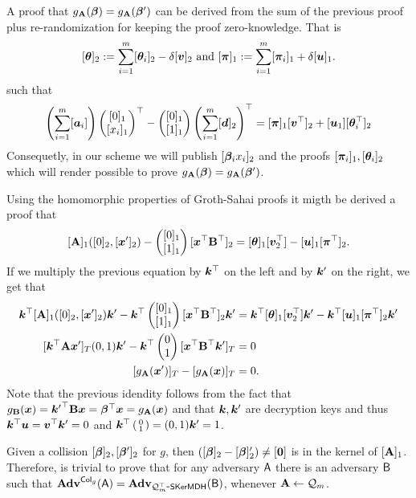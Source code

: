 A proof that $g_{\mathbf{{A}}}({\boldsymbol{\beta}}) = g_{\mathbf{{A}}}({\boldsymbol{\beta}}')$ can be derived from the sum of the previous proof plus re-randomization for keeping the proof zero-knowledge. That is
$$
[{\boldsymbol{\theta}}]_2 := \sum_{i=1}^m [{\boldsymbol{\theta}}_i]_2-\delta[{\boldsymbol{v}}]_2
\text{ and }
[{\boldsymbol{\pi}}]_1 := \sum_{i=1}^m [{\boldsymbol{\pi}}_i]_1+\delta[{\boldsymbol{u}}]_1.
$$
such that
$$
\left(\sum_{i=1}^m [{\boldsymbol{a}}_i]\right)\left(\begin{matrix}{[0]_1}\\{[x_i]_1}\end{matrix}\right)^\top-\left(\begin{matrix}{[0]_1}\\{[1]_1}\end{matrix}\right)\left(\sum_{i=1}^m[{\boldsymbol{d}}]_2\right)^\top =
[{\boldsymbol{\pi}}]_1[{\boldsymbol{v}}^\top]_2 + [{\boldsymbol{u}}_1][{\boldsymbol{\theta}}_i^\top]_2
$$ Consequetly, in our scheme we will publish  $[{\boldsymbol{\beta}}_ix_i]_2$ and the proofs $[{\boldsymbol{\pi}}_i]_1,[{\boldsymbol{\theta}}_i]_2$ which will render possible to prove $g_{\mathbf{{A}}}({\boldsymbol{\beta}})=g_{\mathbf{{A}}}({\boldsymbol{\beta}}')$.

 Using the homomorphic properties of Groth-Sahai proofs it migth be derived a proof that
$$
[\mathbf{{A}}]_1([0]_2, [{\boldsymbol{x}}']_2) - \left(\begin{matrix}{[0]_1}\\{[1]_1}\end{matrix}\right)[{\boldsymbol{x}}^\top\mathbf{{B}}^\top]_2=[{\boldsymbol{\theta}}]_1[{\boldsymbol{v}}^\top_2]-[{\boldsymbol{u}}]_1[{\boldsymbol{\pi}}^\top]_2.
$$
If we multiply the previous equation by ${\boldsymbol{k}}^\top$ on the left and by ${\boldsymbol{k}}'$ on the right, we get that
\begin{align*}
\vecb{k}^\top[\matr{A}]_1([0]_2, [\vecb{x}']_2)\vecb{k}' - \vecb{k}^\top\pmatri{{[0]_1}\\{[1]_1}}[\vecb{x}^\top\matr{B}^\top]_2\vecb{k}'
&=
\vecb{k}^\top[\vecb{\theta}]_1[\vecb{v}^\top_2]\vecb{k}'-\vecb{k}^\top[\vecb{u}]_1[\vecb{\pi}^\top]_2\vecb{k}'\\
[\vecb{k}^\top\matr{A}\vecb{x}']_T(0, 1)\vecb{k}' - \vecb{k}^\top\pmatri{0\\1}[\vecb{x}^\top\matr{B}^\top\vecb{k}']_T
&=0\\
[g_\vecb{\matr{A}}(\vecb{x}')]_T - [g_\matr{A}(\vecb{x})]_T &= 0.
\end{align*}
Note that the previous idendity follows from the fact that $g_{\mathbf{{B}}}({\boldsymbol{x}}) = {{\boldsymbol{k}}'}^\top\mathbf{{B}}{\boldsymbol{x}}={\boldsymbol{\beta}}^\top{\boldsymbol{x}}=g_{\mathbf{{A}}}({\boldsymbol{x}})$ and that ${\boldsymbol{k}},{\boldsymbol{k}}'$ are decryption keys and thus ${\boldsymbol{k}}^\top{\boldsymbol{u}}={\boldsymbol{v}}^\top{\boldsymbol{k}}'=0$ and ${\boldsymbol{k}}^\top\left(\begin{smallmatrix}0\\1\end{smallmatrix}\right)=(0,1){\boldsymbol{k}}'=1$.

Given a collision $[{\boldsymbol{\beta}}]_2,[{\boldsymbol{\beta}}']_2$ for $g$, then $([{\boldsymbol{\beta}}]_2-[{\boldsymbol{\beta}}]'_2)\neq [{\boldsymbol{0}}]$ is in the kernel of $[\mathbf{{A}}]_1$. Therefore, is trivial to prove that for any adversary $\mathsf{A}$ there is an adversary $\mathsf{B}$ such that $\mathbf{Adv}^{\mathsf{Col}_g}(\mathsf{A})=\mathbf{Adv}_{\mathcal{Q}_m^\top\mbox{-}\mathsf{SKerMDH}}(\mathsf{B})$, whenever $\mathbf{{A}}\gets\mathcal{Q}_m$.

